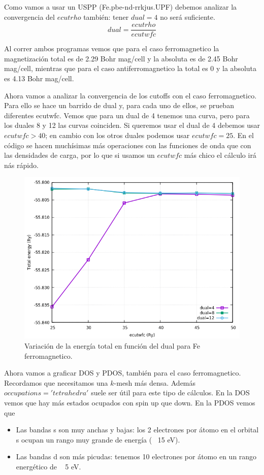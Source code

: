   Como vamos a usar un USPP (Fe.pbe-nd-rrkjus.UPF) debemos analizar la convergencia del $ecutrho$ también: tener $dual=4$ no será suficiente.
    $$dual = \frac{ecutrho}{ecutwfc}$$


  Al correr ambos  programas vemos que para el caso ferromagnetico la magnetización total es de 2.29 Bohr mag/cell y la absoluta es de 2.45 Bohr mag/cell, mientras que para el caso antiferromagnetico la total es 0 y la absoluta es 4.13 Bohr mag/cell.

  Ahora vamos a analizar la convergencia de los cutoffs con el caso ferromagnetico. Para ello se hace un barrido de dual y, para cada uno de ellos, se prueban diferentes ecutwfc. Vemos que para un dual de 4 tenemos una curva, pero para los duales 8 y 12 las curvas coinciden. Si queremos usar el dual de 4 debemos usar $ecutwfc > 40$; en cambio con los otros duales podemos usar $ecutwfc = 25$. En el código se hacen muchísimas más operaciones con las funciones de onda que con las densidades de carga, por lo que si usamos un $ecutwfc$ más chico el cálculo irá nás rápido.
    \begin{figure}[H]
        \centering
        \includegraphics[scale = 0.45]{figs/D2/Fe_fm_dual.png}
        \caption{Variación de la energía total en función del dual para Fe ferromagnetico.}
    \end{figure}

  Ahora vamos a graficar DOS y PDOS, también para el caso ferromagnetico. Recordamos que necesitamos una $k$-mesh más densa. Además $occupations = 'tetrahedra'$ suele ser útil para este tipo de cálculos. En la DOS vemos que hay más estados ocupados con spin up que down. En la PDOS vemos que
    \begin{itemize}
      \item Las bandas s son muy anchas y bajas: los 2 electrones por átomo en el orbital s ocupan un rango muy grande de energía (~ 15 eV).
      \item Las bandas d son más picudas: tenemos 10 electrones por átomo en un rango energético de ~ 5 eV.
    \end{itemize}

